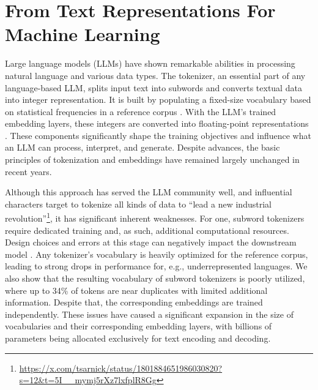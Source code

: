 \documentclass[11pt]{article}
\begin{document}
\section{From Text Representations For Machine Learning}
\label{sec:intro}

Large language models (LLMs) have shown remarkable abilities in processing natural language and various data types. The tokenizer, an essential part of any language-based LLM, splits input text into subwords and converts textual data into integer representation.
It is built by populating a fixed-size vocabulary based on statistical frequencies in a reference corpus \cite{sennrich2016bpe, kudo2018sentencepiece}.
With the LLM's trained embedding layers, these integers are converted into floating-point representations \cite{mikolov2013distributed, press2017using, vaswani2017attention}. These components significantly shape the training objectives and influence  what an LLM can process, interpret, and generate. Despite advances, the basic principles of tokenization and embeddings have remained largely unchanged in recent years.

{\let\thefootnote\relax{}}


Although this approach has served the LLM community well, 
and influential characters target to tokenize all kinds of data to ``lead a new industrial revolution''\footnote{\tiny{\url{https://x.com/tsarnick/status/1801884651986030820?s=12&t=5I__mymj5rXz7lxfplR8Gg}}},
it has significant inherent weaknesses. For one, subword tokenizers require dedicated training and, as such, additional computational resources. Design choices and errors at this stage can negatively impact the downstream model \cite{ali2024tokenizer}. 
Any tokenizer's vocabulary is heavily optimized for the reference corpus, leading to strong drops in performance for, e.g., underrepresented languages. 
We also show that the resulting vocabulary of subword tokenizers is poorly utilized, where up to 34\% of tokens are near duplicates with limited additional information. Despite that, the corresponding embeddings are trained independently. 
These issues have caused a significant expansion in the size of vocabularies and their corresponding embedding layers, with billions of parameters being allocated exclusively for text encoding and decoding.
\end{document}
